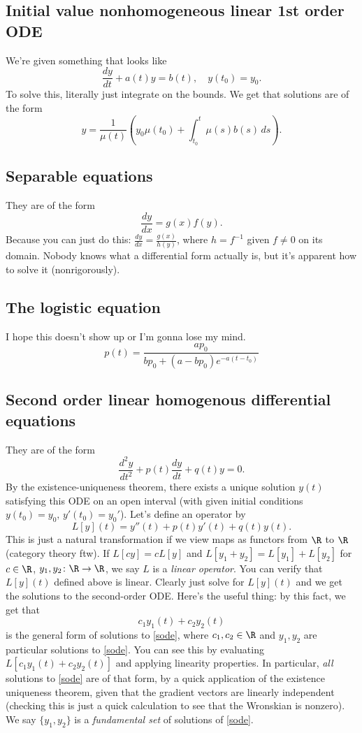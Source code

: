 \subsection{Initial value nonhomogeneous linear 1st order ODE}
We're given something that looks like 
\begin{equation}
    \frac{dy}{dt}+a(t)y=b(t),\quad y(t_0)=y_0.
\end{equation}
To solve this, literally just integrate on the bounds. We get that solutions are of the form \[
    y=\frac{1}{\mu(t)}\left( y_0\mu(t_0) +\int_{t_0}^{t} \mu(s)b(s) \, ds\right) .
\] 
\subsection{Separable equations}
They are of the form 
\begin{equation}
    \frac{dy}{dx}=g(x)f(y).
\end{equation}
Because you can just do this: $\frac{dy}{dx}=\frac{g(x)}{h(y)}$, where $h=f^{-1}$ given $f\neq 0$ on its domain. Nobody knows what a differential form actually is, but it's apparent how to solve it (nonrigorously).
\subsection{The logistic equation}
I hope this doesn't show up or I'm gonna lose my mind.
\begin{equation}
    p(t)=\frac{ap_0}{bp_0+(a-bp_0)e^{-a(t-t_0)}}
\end{equation}
\subsection{Second order linear homogenous differential equations}
They are of the form 
\begin{equation}\label{sode}
    \frac{d^2y}{dt^2}+p(t)\frac{dy}{dt}+q(t)y=0.
\end{equation}
By the existence-uniqueness theorem, there exists a unique solution $y(t)$ satisfying this ODE on an open interval (with given initial conditions $y(t_0)=y_0,\,y'(t_0)=y_0'$).  Let's define an operator by\[
    L[y](t)=y''(t)+p(t)y'(t)+q(t)y(t).
\] This is just a natural transformation if we view maps as functors from $\R$ to $\R$ (category theory ftw). If $L[cy]=cL[y]$ and $L[y_1+y_2]=L[y_1]+L[y_2]$ for $c\in \R$, $y_1,y_2 \colon \R \to \R$, we say $L$ is a \emph{linear operator}. You can verify that $L[y](t)$ defined above is linear. Clearly just solve for $L[y](t)$ and we get the solutions to the second-order ODE. Here's the useful thing: by this fact, we get that \[
c_1y_1(t)+c_2y_2(t)     
\] is the general form of solutions to \cref{sode}, where $c_1,c_2\in \R$ and $y_1,y_2$ are particular solutions to \cref{sode}. You can see this by evaluating $L[c_1y_1(t)+c_2y_2(t)]$ and applying linearity properties. In particular, \emph{all} solutions to \cref{sode} are of that form, by a quick application of the existence uniqueness theorem, given that the gradient vectors are linearly independent (checking this is just a quick calculation to see that the Wronskian is nonzero). We say $\{y_1,y_2\} $ is a \emph{fundamental set} of solutions of \cref{sode}.
